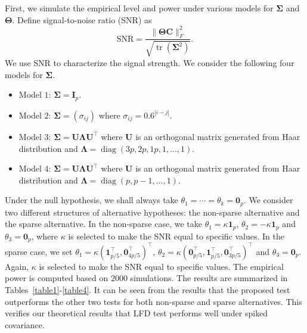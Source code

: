 \documentclass[12pt]{article} %
\DeclareMathOperator{\mytr}{tr}
\DeclareMathOperator{\mydiag}{diag}
\newcommand{\bC}{\mathbf{C}}
\newcommand{\bI}{\mathbf{I}}
\newcommand{\bU}{\mathbf{U}}
\newcommand{\bfsym}[1]{\ensuremath{\boldsymbol{#1}}}
\def\bLambda {\bfsym {\Lambda}}
\def\bSigma {\bfsym {\Sigma}}
\def\bTheta {\bfsym {\Theta}}
\theoremstyle{definition}
\begin{document}
First, we simulate the empirical level and power under various models for $\bSigma$ and $\bTheta$.
Define signal-to-noise ratio (SNR) as
$$
\textrm{SNR}=\frac{\|\bTheta\bC\|_F^2}{\sqrt{\mytr(\bSigma^2)}}.
$$
We use SNR to characterize the signal strength.
We consider the following four models for $\bSigma$.
\begin{itemize}
    \item Model $1$:
        $\bSigma= \bI_p$.
    \item Model $2$:
        $\bSigma = (\sigma_{ij})$ where $\sigma_{ij}=0.6^{|i-j|}$.
    \item Model $3$:
        $\bSigma= \bU \bLambda \bU^\top$ where $\bU$ is an orthogonal matrix generated from Haar distribution and $\bLambda=\mydiag(3p,2p,1p,1,\ldots,1)$.
    \item Model $4$:
        $\bSigma= \bU \bLambda \bU^\top$ where $\bU$ is an orthogonal matrix generated from Haar distribution and $\bLambda=\mydiag(p,p-1,\ldots,1)$.
\end{itemize}
Under the null hypothesis, we shall always take $\theta_1=\cdots=\theta_k=\mathbf{0}_p$. We consider two different structures of alternative hypotheses: the non-sparse alternative and the sparse alternative.
In the non-sparse case, we take $\theta_1=\kappa \mathbf 1_p$, $\theta_2=-\kappa \mathbf 1_p$ and $\theta_3=\mathbf{0}_p$, where $\kappa$ is selected to make the SNR equal to specific values.
In the sparse case, we set $\theta_1=\kappa (\mathbf 1_{p/5}^\top,\mathbf{0}_{4p/5}^\top)^\top$, $\theta_2=\kappa (\mathbf{0}_{p/5}^\top, \mathbf 1_{p/5}^\top,\mathbf{0}_{3p/5}^\top)^\top$ and $\theta_3=\mathbf{0}_p$.
Again, $\kappa$ is selected to make the SNR equal to specific values.
The empirical power is computed based on $2000$ simulations.
The results are summarized in Tables~\ref{table1}-\ref{table4}. It can be seen from the results that the proposed test outperforms the other two tests for both non-sparse and sparse alternatives.
This verifies our theoretical results that LFD test performs well under spiked covariance.
\end{document}
